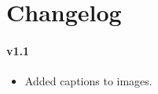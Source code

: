 \chapter*{Changelog}
\subsubsection{v1.1}
\begin{itemize}
\item Added captions to images.
\end{itemize}
